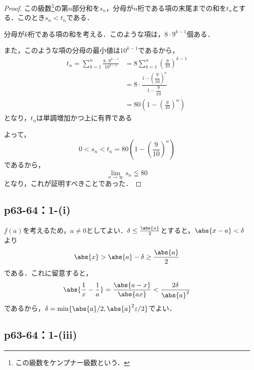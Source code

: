 \documentclass[a4paper,10pt,fleqn]{ltjsarticle}
\begin{document}
    \begin{tleftbar}
        \begin{proof}
        この級数\footnote{この級数をケンプナー級数という．}の第$n$部分和を$s_n$，分母が$n$桁である項の末尾までの和を$t_n$とする．このとき$s_n < t_n$である．

        分母が$k$桁である項の和を考える．このような項は，$8 \cdot 9^{k-1}$個ある．
        
        また，このような項の分母の最小値は$10^{k-1}$であるから，
        \begin{align*} 
            t_n = \sum_{k=1}^{n} \frac{8 \cdot 9^{k-1}}{10^{k-1}} &= 8 \sum_{k=1}^{n} \left(\frac{9}{10}\right)^{k-1} \\
            &= 8 \cdot \frac{1-\left(\dfrac{9}{10}\right)^n}{1-\dfrac{9}{10}} \\
            & = 80 \left(1-\left(\frac{9}{10}\right)^n\right)
        \end{align*}
        となり，$t_n$は単調増加かつ上に有界である

        よって，
        \[
            0 < s_n < t_n = 80 \left(1-\left(\frac{9}{10}\right)^n\right)
        \]
        であるから，
        \[
            \lim_{n \to \infty} s_n \leqq 80
        \]
        となり，これが証明すべきことであった．
    \end{proof}
\end{tleftbar}


    \newpage 


    \subsection*{p63-64：1-(i)}

\begin{tleftbar}
    $f(a)$を考えるため，$a \ne 0$としてよい．$\delta \le \frac{\abs{a}}{2}$とすると，$\abs{x-a}<\delta$より
    \[
       \abs{x} > \abs{a}-\delta \ge \frac{\abs{a}}{2}
    \]
    である．これに留意すると，
    \[
        \abs{\frac{1}{x}-\frac{1}{a}}=\frac{\abs{a-x}}{\abs{ax}} <\frac{2 \delta}{\abs{a}^2}
    \]
    であるから，$\delta = \min \{ \abs{a}/2,\abs{a}^2\varepsilon/2 \}$でよい．
\end{tleftbar}



\subsection*{p63-64：1-(iii)}
\end{document}
